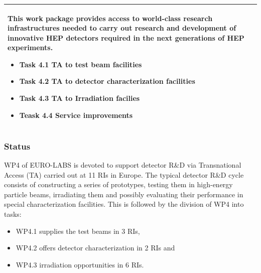 \begin{table}[H]
\begin{tabular}{|p{}|}
        \rowcolor{white} 
        \hspace*{-0.75cm} 
        \begin{minipage}[t]{\textwidth}
        {\leftskip=15pt
        This work package provides access to world-class research infrastructures needed to carry out research and development of innovative HEP detectors required in the next generations of HEP experiments.
    		\begin{itemize}
    		    \item Task 4.1 TA to test beam facilities 
    			\item Task 4.2 TA to detector characterization facilities
			    \item Task 4.3 TA to Irradiation facilies
                    \item Teask 4.4 Service improvements
    		\end{itemize} 
    		\vspace*{0.10em}
        }
	\end{minipage}        
        \\
        \hline
    \end{tabular}
    \vspace{0.5em}\vfill
\end{table}
\subsubsection*{Status}
WP4 of EURO-LABS is devoted to support detector R\&D via Transnational Access (TA) carried out at 11 RIs in Europe. The typical detector R\&D cycle consists of constructing a series of prototypes, testing them in high-energy particle beams, irradiating them and possibly evaluating their performance in special characterization facilities. This is followed by the division of WP4 into tasks: 
\begin{itemize}
    \item WP4.1 supplies the test beams in 3 RIs, 
    \item WP4.2 offers detector characterization in 2 RIs and
    \item WP4.3 irradiation opportunities in 6 RIs.
\end{itemize}

